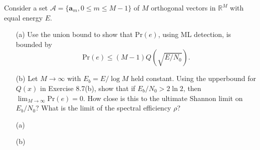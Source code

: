 \documentclass{assignment}
\begin{document}
\begin{prob}
    Consider a set $\mathcal{A}=\{\bm{a}_m,0\leq m\leq M-1\}$ of $M$ orthogonal vectors in $\mathbb{R}^M$ with equal energy $E$.
    \begin{itemize}
        \item[(a)] Use the union bound to show that $\mathrm{Pr}(e)$, using ML detection, is bounded by
        \[
            \mathrm{Pr}(e)\leq(M-1)Q(\sqrt{E/N_0}).
        \]
        \item[(b)] Let $M\rightarrow\infty$ with $E_b=E/\log M$ held constant. Using the upperbound for $Q(x)$ in Exercise 8.7(b), show that if $E_b/N_0>2\ln 2$, then $\lim_{M\rightarrow\infty}\mathrm{Pr}(e)=0$. How close is this to the ultimate Shannon limit on $E_b/N_0$? What is the limit of the spectral efficiency $\rho$?
    \end{itemize}
\end{prob}
\begin{sol}
    \begin{itemize}
        \item[(a)] 
        \item[(b)] 
    \end{itemize}
\end{sol}
\end{document}
